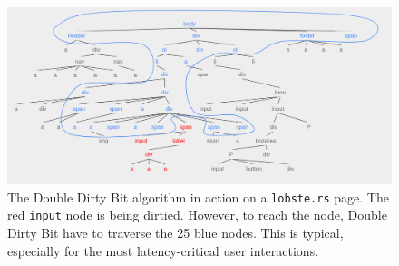 \begin{figure}
\includegraphics[scale=0.3]{lobsters.png}
\caption{
The Double Dirty Bit algorithm in action
  on a \texttt{lobste.rs} page.
The red \texttt{input} node is being dirtied.
However, to reach the node, Double Dirty Bit have to traverse the 25 blue nodes.
This is typical, especially for
  the most latency-critical user interactions.
}
\label{fig:dom-tree-db}
\end{figure}

